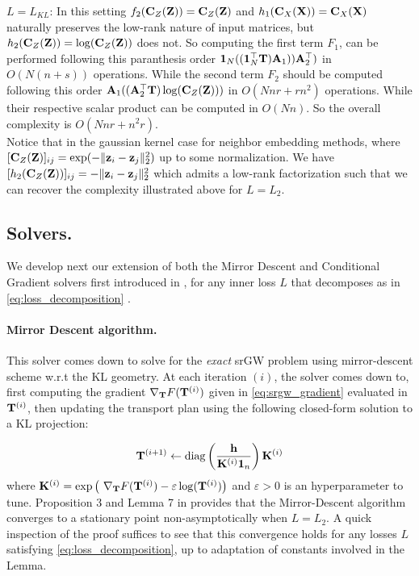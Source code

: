 \underline{$L=L_{KL}$}: In this setting $f_2({\mathbf{C}}_Z({\mathbf{Z}})) = {\mathbf{C}}_Z({\mathbf{Z}})$ and $h_1({\mathbf{C}}_X({\mathbf{X}})) = {\mathbf{C}}_X({\mathbf{X}})$ naturally preserves the low-rank nature of input matrices, but $h_2({\mathbf{C}}_Z({\mathbf{Z}})) = \log({\mathbf{C}}_Z({\mathbf{Z}}))$ does not. So computing the first term $F_1$, can be performed following this paranthesis order $\bm{1}_N ((  \bm{1}_N^\top {\mathbf{T}}) {\mathbf{A}}_1)) {\mathbf{A}}_2^\top) $ in $O(N(n + s))$ operations. While the second term $F_2$ should be computed following this order ${\mathbf{A}}_1 (({\mathbf{A}}_2^\top {\mathbf{T}})  \log({\mathbf{C}}_Z({\mathbf{Z}})))$ in $O(Nnr + rn^2)$ operations. While their respective scalar product can be computed in $O(Nn)$. So the overall complexity is $O(Nnr + n^2r)$.\\
Notice that in the gaussian kernel case for neighbor embedding methods, where $[{\mathbf{C}}_Z({\mathbf{Z}})]_{ij} = \exp(-\|{\mathbf{z}}_i-{\mathbf{z}}_j\|_2^2)$ up to some normalization. We have $[h_2({\mathbf{C}}_Z({\mathbf{Z}}))]_{ij} = -\|{\mathbf{z}}_i-{\mathbf{z}}_j\|_2^2$ which admits a low-rank factorization such that we can recover the complexity illustrated above for $L=L_2$.

\subsection{Solvers.}
We develop next our extension of both the Mirror Descent and Conditional Gradient solvers first introduced in \cite{vincent2021semi}, for any inner loss $L$ that decomposes as in \eqref{eq:loss_decomposition} .

\paragraph{Mirror Descent algorithm.} This solver comes down to solve for the \emph{exact} srGW problem using mirror-descent scheme w.r.t the KL geometry. At each iteration $(i)$, the solver comes down to, first computing the gradient $\nabla_{{\mathbf{T}}}F({\mathbf{T}}^{(i)})$ given in \eqref{eq:srgw_gradient} evaluated in ${\mathbf{T}}^{(i)}$, then updating the transport plan using the following closed-form solution to a KL projection:

\begin{equation}
{\mathbf{T}}^{(i+1)} \leftarrow \operatorname{diag}\left( \frac{{\mathbf{h}}}{{\mathbf{K}}^{(i)}\bm{1}_n} \right) {\mathbf{K}}^{(i)}
\end{equation}
where ${\mathbf{K}}^{(i)} = \exp \left(\ \nabla_{{\mathbf{T}}}F({\mathbf{T}}^{(i)}) - \varepsilon \log({\mathbf{T}}^{(i)})  \right)$ and $\varepsilon > 0$ is an hyperparameter to tune. Proposition 3 and Lemma 7 in \cite[Chapter 6]{vincent2023optimal} provides that the Mirror-Descent algorithm converges to a stationary point non-asymptotically when $L=L_2$. A quick inspection of the proof suffices to see that this convergence holds for any losses $L$ satisfying \eqref{eq:loss_decomposition}, up to adaptation of constants involved in the Lemma.

